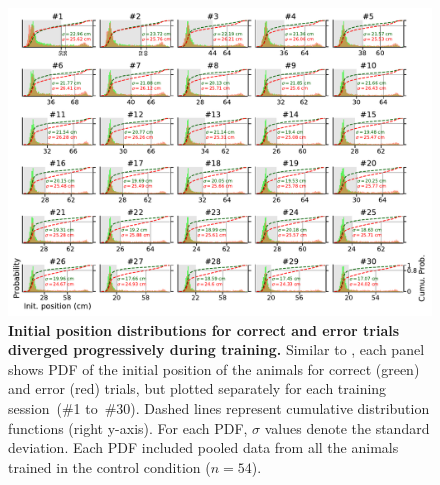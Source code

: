 \begin{figure}[!h]
  \begin{center}
    \includegraphics[width=.8\linewidth]{ch-appendicies/figures/InitPos.pdf}
    \caption[Initial position evolution]
    {\textbf{Initial position distributions for correct and error trials diverged progressively during training.}
    Similar to , each panel shows PDF of the initial position of the animals for correct (green) and error (red) trials, but plotted separately for each training session~(\#1 to~\#30).
    Dashed lines represent cumulative distribution functions (right y-axis).
    For each PDF, $\sigma$ values denote the standard deviation.
    Each PDF included pooled data from all the animals trained in the control condition ($n=54$).
    }
    \label{fig:appendix:initPos}
  \end{center}
\end{figure}